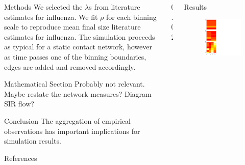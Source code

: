 \documentclass[final]{beamer} %
\newcommand{\spaceProp}{0.02}
\newcommand{\spacer}{\begin{column}{\spaceProp\paperwidth}\end{column}}
\newenvironment{oneCol}{\begin{column}[t]{0.225\paperwidth}}{\end{column}}
\newenvironment{threeCol}{\begin{column}[t]{0.715\paperwidth}}{\end{column}}
\begin{document}
\begin{frame}{}
\begin{columns}[t]
\begin{oneCol}
\begin{block}{Methods}
We selected the $\lambda$s from literature estimates for influenza.  We fit $\rho$ for each binning scale to reproduce mean final size literature estimates for influenza.  The simulation proceeds as typical for a static contact network, however as time passes one of the binning boundaries, edges are added and removed accordingly.
    \end{block}
    \begin{block}{Mathematical Section}
Probably not relevant.  Maybe restate the network measures?  Diagram SIR flow?
    \end{block}
    \begin{block}{Conclusion}
The aggregation of empirical observations has important implications for simulation results.
    \end{block}
    \begin{block}{References}
      \nocite{*} %
      \small{
      \vspace{0.75in}}
    \end{block}
    \end{oneCol}
    \spacer{}
    \begin{threeCol}
    \begin{block}{Results}
    \begin{figure}
\includegraphics{poster-plotfig1}

\end{figure}
\end{block}
\end{threeCol}
\end{columns}
\end{frame}
\end{document}
